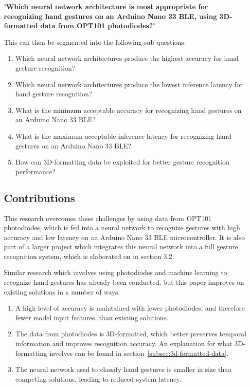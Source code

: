 \textbf{'Which neural network architecture is most appropriate for recognizing hand gestures on an Arduino Nano 33 BLE, using 3D-formatted data from OPT101 photodiodes?'}

This can then be segmented into the following sub-questions:
\begin{enumerate}
    \item Which neural network architectures produce the highest accuracy for hand gesture recognition?
    \item Which neural network architectures produce the lowest inference latency for hand gesture recognition?
    \item What is the minimum acceptable accuracy for recognizing hand gestures on an Arduino Nano 33 BLE?
    \item What is the maximum acceptable inference latency for recognizing hand gestures on an Arduino Nano 33 BLE?
    \item How can 3D-formatting data be exploited for better gesture recognition performance?
\end{enumerate}

\subsection{Contributions}\label{subsec:contributions}
This research overcomes these challenges by using data from OPT101 photodiodes, which is fed into a neural network to recognize gestures with high accuracy and low latency on an Arduino Nano 33 BLE microcontroller.
It is also part of a larger project which integrates this neural network into a full gesture recognition system, which is elaborated on in section 3.2.

Similar research which involves using photodiodes and machine learning to recognize hand gestures has already been conducted, but this paper improves on existing solutions in a number of ways:
\begin{enumerate}
    \item A high level of accuracy is maintained with fewer photodiodes, and therefore fewer model input features, than existing solutions.
    \item The data from photodiodes is 3D-formatted, which better preserves temporal information and improves recognition accuracy.
    An explanation for what 3D-formatting involves can be found in section~\ref{subsec:3d-formatted-data}.
    \item The neural network used to classify hand gestures is smaller in size than competing solutions, leading to reduced system latency.
\end{enumerate}

